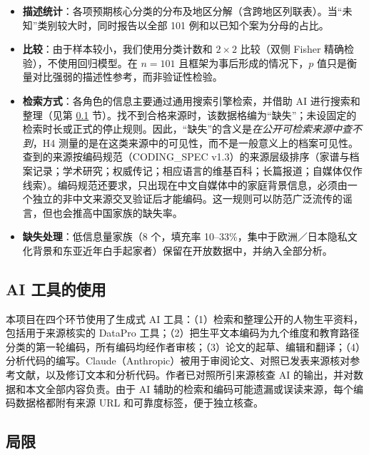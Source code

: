 \documentclass[UTF8,a4paper,11pt]{ctexart}
\begin{document}
\begin{itemize}
\item \textbf{描述统计}：各项预期核心分类的分布及地区分解（含跨地区列联表）。当“未知”类别较大时，同时报告以全部 101 例和以已知个案为分母的占比。
\item \textbf{比较}：由于样本较小，我们使用分类计数和 $2\times2$ 比较（双侧 Fisher 精确检验），不使用回归模型。在 $n=101$ 且框架为事后形成的情况下，$p$ 值只是衡量对比强弱的描述性参考，而非验证性检验。
\item \textbf{检索方式}：各角色的信息主要通过通用搜索引擎检索，并借助 AI 进行搜索和整理（见第 \ref{sec:ai} 节）。找不到合格来源时，该数据格编为“缺失”；未设固定的检索时长或正式的停止规则。因此，“缺失”的含义是\emph{在公开可检索来源中查不到}，H4 测量的是在这类来源中的可见性，而不是一般意义上的档案可见性。查到的来源按编码规范（CODING\_SPEC v1.3）的来源层级排序（家谱与档案记录；学术研究；权威传记；相应语言的维基百科；长篇报道；自媒体仅作线索）。编码规范还要求，只出现在中文自媒体中的家庭背景信息，必须由一个独立的非中文来源交叉验证后才能编码。这一规则可以防范广泛流传的谣言，但也会推高中国家族的缺失率。
\item \textbf{缺失处理}：低信息量家族（8 个，填充率 10--33\%，集中于欧洲／日本隐私文化背景和东亚近年白手起家者）保留在开放数据中，并纳入全部分析。
\end{itemize}

\subsection{AI 工具的使用}
\label{sec:ai}

本项目在四个环节使用了生成式 AI 工具：（1）检索和整理公开的人物生平资料，包括用于来源核实的 DataPro 工具；（2）把生平文本编码为九个维度和教育路径分类的第一轮编码，所有编码均经作者审核；（3）论文的起草、编辑和翻译；（4）分析代码的编写。Claude（Anthropic）被用于审阅论文、对照已发表来源核对参考文献，以及修订文本和分析代码。作者已对照所引来源核查 AI 的输出，并对数据和本文全部内容负责。由于 AI 辅助的检索和编码可能遗漏或误读来源，每个编码数据格都附有来源 URL 和可靠度标签，便于独立核查。

\subsection{局限}
\label{sec:limits}
\end{document}
